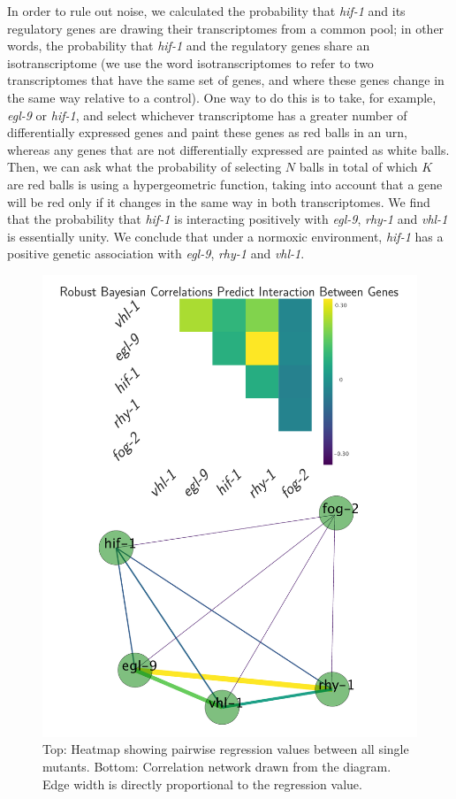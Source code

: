 \documentclass[9pt,twocolumn,twoside]{pnas-new}
\newcommand{\egl}{\emph{egl-9}}
\newcommand{\rhy}{\emph{rhy-1}}
\newcommand{\vhl}{\emph{vhl-1}}
\newcommand{\hif}{\emph{hif-1}}
\begin{document}
In order to rule out noise, we calculated the probability that \hif{} and its regulatory genes are drawing their transcriptomes from a common pool; in other words, the probability that \hif{} and the regulatory genes share an isotranscriptome (we use the word isotranscriptomes to refer to two transcriptomes that have the same set of genes, and where these genes change in the same way relative to a control).
One way to do this is to take, for example, \egl{} or \hif{}, and select whichever transcriptome has a greater number of differentially expressed genes and paint these genes as red balls in an urn, whereas any genes that are not differentially expressed are painted as white balls. Then, we can ask what the probability of selecting $N$ balls in total of which $K$ are red balls is using a hypergeometric function, taking into account that a gene will be red only if it changes in the same way in both transcriptomes. We find that the probability that \hif{} is interacting positively with \egl{}, \rhy{} and \vhl{} is essentially unity. We conclude that under a normoxic environment, \hif{} has a positive genetic association with \egl{}, \rhy{} and \vhl{}.
\begin{figure}[tbhp]
\centering
\includegraphics[width=.8\linewidth]{figs/bayesian_heat_map.pdf}
\caption{Top: Heatmap showing pairwise regression values between all single mutants. Bottom: Correlation network drawn from the diagram. Edge width is directly proportional to the regression value.}
\label{fig:heatmap}
\end{figure}
\end{document}

